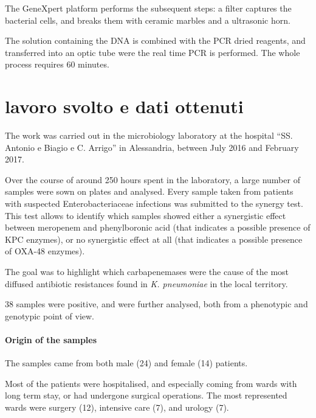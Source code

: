 \documentclass[11pt]{report}
\begin{document}
The GeneXpert platform performs the subsequent steps: a filter captures the bacterial cells, and breaks them with ceramic marbles and a ultrasonic horn.

The solution containing the DNA is combined with the PCR dried reagents, and transferred into an optic tube were the real time PCR is performed.
The whole process requires 60 minutes.

\chapter{lavoro svolto e dati ottenuti}

The work was carried out in the microbiology laboratory at the hospital ``SS. Antonio e Biagio e C. Arrigo'' in Alessandria, between July 2016 and February 2017.

Over the course of around 250 hours spent in the laboratory, a large number of samples were sown on plates and analysed.
Every sample taken from patients with suspected Enterobacteriaceae infections was submitted to the synergy test.
This test allows to identify which samples showed either a synergistic effect between meropenem and phenylboronic acid (that indicates a possible presence of KPC enzymes), or no synergistic effect at all (that indicates a possible presence of OXA-48 enzymes).

The goal was to highlight which carbapenemases were the cause of the most diffused antibiotic resistances found in \emph{K. pneumoniae} in the local territory.

38 samples were positive, and were further analysed, both from a phenotypic and genotypic point of view.

\clearpage

\subsubsection{Origin of the samples}

The samples came from both male (24) and female (14) patients.

Most of the patients were hospitalised, and especially coming from wards with long term stay, or had undergone surgical operations.
The most represented wards were surgery (12), intensive care (7), and urology (7).
\end{document}
